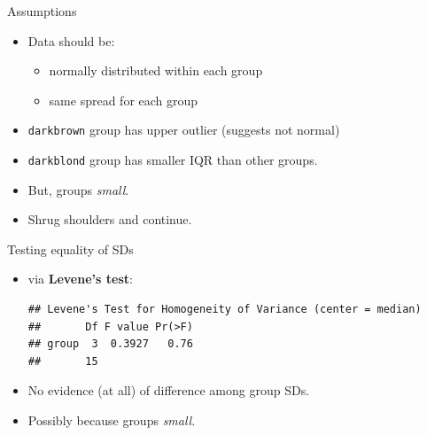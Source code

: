 \begin{frame}[fragile]{Assumptions}
  
  \begin{itemize}
  \item Data should be:
    \begin{itemize}
    \item normally distributed within each group
    \item same spread for each group
    \end{itemize}

  \item \texttt{darkbrown} group has upper outlier (suggests not normal)
  \item \texttt{darkblond} group has smaller IQR than other groups.
  \item But, groups \emph{small}.
  \item Shrug shoulders and continue.
  \end{itemize}
  
\end{frame}

\begin{frame}[fragile]{Testing equality of SDs}
  
  
  \begin{itemize}
  \item   via \textbf{Levene's test}:
    {\small
\begin{knitrout}
\color{fgcolor}\begin{kframe}
\begin{alltt}
\hlopt{::}\hlopt{~}
\end{alltt}
\begin{verbatim}
## Levene's Test for Homogeneity of Variance (center = median)
##       Df F value Pr(>F)
## group  3  0.3927   0.76
##       15
\end{verbatim}
\end{kframe}
\end{knitrout}
 }
\item No evidence (at all) of difference among group SDs.
\item Possibly because groups \emph{small}.
  \end{itemize}
  
\end{frame}

